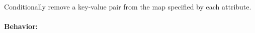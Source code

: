 Conditionally remove a key-value pair from the map specified by each attribute.

\paragraph{Behavior:}
\begin{itemize}[noitemsep]


\end{itemize}
